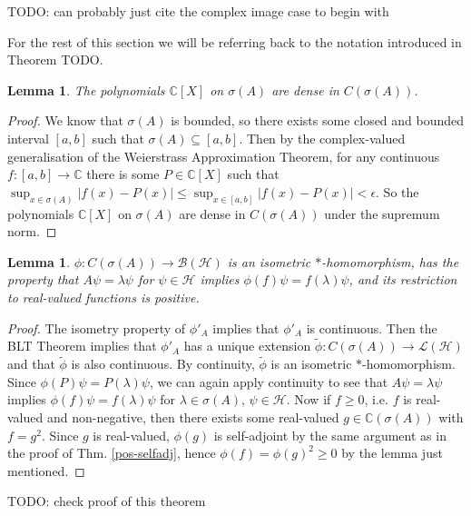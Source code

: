 \documentclass[12pt,oneside]{report}
\newtheorem{lem}[thm]{Lemma}
\begin{document}
TODO: can probably just cite the complex image case to begin with

For the rest of this section we will be referring back to the notation introduced in Theorem TODO.

\begin{lem}
    The polynomials $\mathbb{C}[X]$ on $\sigma(A)$ are dense in $C(\sigma(A))$.
\end{lem}
\begin{proof}
    We know that $\sigma(A)$ is bounded, so there exists some closed and bounded interval $[a,b]$ such that $\sigma(A) \subseteq [a,b]$. Then by the complex-valued generalisation of the Weierstrass Approximation Theorem, for any continuous $f: [a,b] \to \mathbb{C}$ there is some $P \in \mathbb{C}[X]$ such that $\sup_{x\in\sigma(A)} |f(x) - P(x)| \leq \sup_{x\in[a,b]} |f(x) - P(x)| < \epsilon$. So the polynomials $\mathbb{C}[X]$ on $\sigma(A)$ are dense in $C(\sigma(A))$ under the supremum norm.
\end{proof}

\begin{lem}
    $\phi: C(\sigma(A)) \to \mathscr{B}(\mathscr{H})$ is an isometric $*$-homomorphism, has the property that $A\psi = \lambda \psi$ for $\psi \in \mathscr{H}$ implies $\phi(f)\psi = f(\lambda)\psi$, and its restriction to real-valued functions is positive.
\end{lem}
\begin{proof}
    The isometry property of $\phi'_{A}$ implies that $\phi'_{A}$ is continuous. Then the BLT Theorem implies that $\phi'_{A}$ has a unique extension $\tilde{\phi}: C(\sigma(A)) \to \mathscr{L}(\mathscr{H})$ and that $\tilde{\phi}$ is also continuous. By continuity, $\tilde{\phi}$ is an isometric $*$-homomorphism. Since $\phi(P)\psi = P(\lambda)\psi$, we can again apply continuity to see that $A\psi = \lambda \psi$ implies $\phi(f)\psi = f(\lambda)\psi$ for $\lambda \in \sigma(A)$, $\psi \in \mathscr{H}$. Now if $f \geq 0$, i.e. $f$ is real-valued and non-negative, then there exists some real-valued $g \in \mathbb{C}(\sigma(A))$ with $f = g^{2}$. Since $g$ is real-valued, $\phi(g)$ is self-adjoint by the same argument as in the proof of Thm. \ref{pos-selfadj}, hence $\phi(f) = \phi(g)^{2} \geq 0$ by the lemma just mentioned.
\end{proof}

TODO: check proof of this theorem
\end{document}
